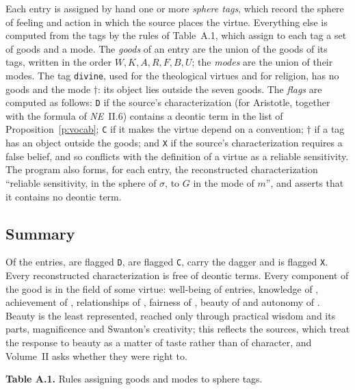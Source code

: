 \documentclass{situationist-preprint}
\begin{document}
Each entry is assigned by hand one or more \emph{sphere tags}, which record the sphere of feeling and action in which the source places the virtue. Everything else is computed from the tags by the rules of Table~A.1, which assign to each tag a set of goods and a mode. The \emph{goods} of an entry are the union of the goods of its tags, written in the order $W,K,A,R,F,B,U$; the \emph{modes} are the union of their modes. The tag \texttt{divine}, used for the theological virtues and for religion, has no goods and the mode $\dagger$: its object lies outside the seven goods. The \emph{flags} are computed as follows: \texttt{D} if the source's characterization (for Aristotle, together with the formula of \emph{NE}~II.6) contains a deontic term in the list of Proposition~\ref{p:vocab}; \texttt{C} if it makes the virtue depend on a convention; $\dagger$ if a tag has an object outside the goods; and \texttt{X} if the source's characterization requires a false belief, and so conflicts with the definition of a virtue as a reliable sensitivity. The program also forms, for each entry, the reconstructed characterization \enquote{reliable sensitivity, in the sphere of $\sigma$, to $G$ in the mode of $m$}, and asserts that it contains no deontic term.

\subsection*{Summary}

Of the \stnconc{} entries, \stnconcD{} are flagged \texttt{D}, \stnconcC{} are flagged \texttt{C}, \stnconcR{} carry the dagger and \stnconcX{} is flagged \texttt{X}. Every reconstructed characterization is free of deontic terms. Every component of the good is in the field of some virtue: well-being of \stngoodwellbeing{} entries, knowledge of \stngoodknowledge{}, achievement of \stngoodachievement{}, relationships of \stngoodrelationships{}, fairness of \stngoodfairness{}, beauty of \stngoodbeauty{} and autonomy of \stngoodautonomy{}. Beauty is the least represented, reached only through practical wisdom and its parts, magnificence and Swanton's creativity; this reflects the sources, which treat the response to beauty as a matter of taste rather than of character, and Volume~II asks whether they were right to.

\begin{center}\small\textbf{Table A.1.} Rules assigning goods and modes to sphere tags.\end{center}

\end{document}

